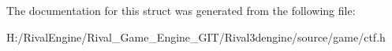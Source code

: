 The documentation for this struct was generated from the following file\+:\begin{DoxyCompactItemize}
\item 
H\+:/\+Rival\+Engine/\+Rival\+\_\+\+Game\+\_\+\+Engine\+\_\+\+G\+I\+T/\+Rival3dengine/source/game/ctf.\+h\end{DoxyCompactItemize}
